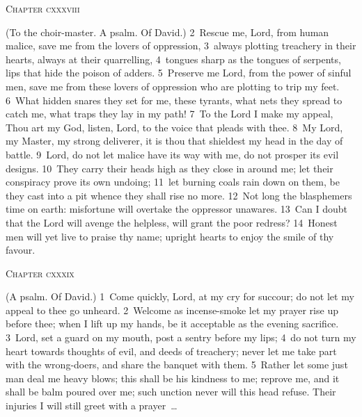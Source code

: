 \documentclass[10pt]{book} %
\begin{document}
\begin{large}\begin{center}\textsc{Chapter cxxxviii}\end{center}\end{large}
(To the choir-master. A psalm. Of David.)
\textcolor{benred8}{2}~Rescue me, Lord, from human malice, save me from the lovers of oppression, \textcolor{benred8}{3}~always plotting treachery in their hearts, always at their quarrelling, \textcolor{benred8}{4}~tongues sharp as the tongues of serpents, lips that hide the poison of adders. \textcolor{benred8}{5}~Preserve me Lord, from the power of sinful men, save me from these lovers of oppression who are plotting to trip my feet. \textcolor{benred8}{6}~What hidden snares they set for me, these tyrants, what nets they spread to catch me, what traps they lay in my path!
\textcolor{benred8}{7}~To the Lord I make my appeal, Thou art my God, listen, Lord, to the voice that pleads with thee. \textcolor{benred8}{8}~My Lord, my Master, my strong deliverer, it is thou that shieldest my head in the day of battle. \textcolor{benred8}{9}~Lord, do not let malice have its way with me, do not prosper its evil designs. \textcolor{benred8}{10}~They carry their heads high as they close in around me; let their conspiracy prove its own undoing; \textcolor{benred8}{11}~let burning coals rain down on them, be they cast into a pit whence they shall rise no more. \textcolor{benred8}{12}~Not long the blasphemer\textquotesingle s time on earth: misfortune will overtake the oppressor unawares. \textcolor{benred8}{13}~Can I doubt that the Lord will avenge the helpless, will grant the poor redress? \textcolor{benred8}{14}~Honest men will yet live to praise thy name; upright hearts to enjoy the smile of thy favour.
\begin{large}\begin{center}\textsc{Chapter cxxxix}\end{center}\end{large}
(A psalm. Of David.)
\textcolor{benred8}{1}~Come quickly, Lord, at my cry for succour; do not let my appeal to thee go unheard. \textcolor{benred8}{2}~Welcome as incense-smoke let my prayer rise up before thee; when I lift up my hands, be it acceptable as the evening sacrifice. \textcolor{benred8}{3}~Lord, set a guard on my mouth, post a sentry before my lips; \textcolor{benred8}{4}~do not turn my heart towards thoughts of evil, and deeds of treachery; never let me take part with the wrong-doers, and share the banquet with them. \textcolor{benred8}{5}~Rather let some just man deal me heavy blows; this shall be his kindness to me; reprove me, and it shall be balm poured over me; such unction never will this head refuse. Their injuries I will still greet with a prayer~\ldots\ 
\end{document}
